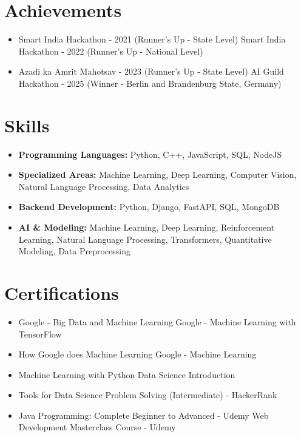 \documentclass[a4paper,10pt]{article}
\begin{document}
\section*{Achievements}
\begin{itemize}
\item Smart India Hackathon - 2021 (Runner's Up - State Level) \hfill Smart India Hackathon - 2022 (Runner's Up - National Level)
\item Azadi ka Amrit Mahotsav - 2023 (Runner's Up - State Level) \hfill AI Guild Hackathon - 2025 (Winner - Berlin and Brandenburg State, Germany)
\end{itemize}

\section*{Skills}
\begin{itemize}
  \item \textbf{Programming Languages:} Python, C++, JavaScript, SQL, NodeJS
  \item \textbf{Specialized Areas:} Machine Learning, Deep Learning, Computer Vision, Natural Language Processing, Data Analytics
  \item \textbf{Backend Development:} Python, Django, FastAPI, SQL, MongoDB
  \item \textbf{AI \& Modeling:} Machine Learning, Deep Learning, Reinforcement Learning, Natural Language Processing, Transformers, Quantitative Modeling, Data Preprocessing
\end{itemize}

\section*{Certifications}
\begin{itemize}
\item Google - Big Data and Machine Learning \hfill Google - Machine Learning with TensorFlow
\item How Google does Machine Learning \hfill Google - Machine Learning
\item Machine Learning with Python \hfill Data Science Introduction
\item Tools for Data Science \hfill Problem Solving (Intermediate) - HackerRank
\item Java Programming: Complete Beginner to Advanced - Udemy \hfill Web Development Masterclass Course - Udemy
\end{itemize}
\end{document}
